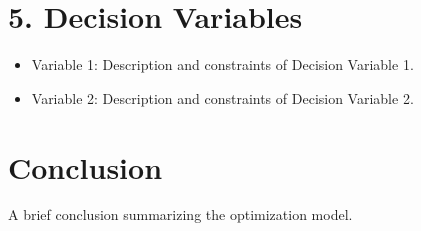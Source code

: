 \documentclass[a4paper,12pt]{article}
\begin{document}
\section{5. Decision Variables}
\begin{itemize}[noitemsep]
    \item Variable 1: Description and constraints of Decision Variable 1.
    \item Variable 2: Description and constraints of Decision Variable 2.
\end{itemize}

\section*{Conclusion}
A brief conclusion summarizing the optimization model.
\end{document}
